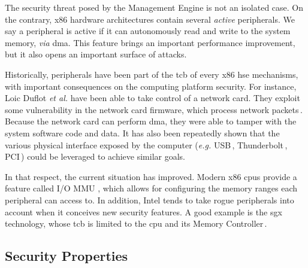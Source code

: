 The security threat posed by the Management Engine is not an isolated case.
%
On the contrary, x86 hardware architectures contain several \emph{active}
peripherals.
%
We say a peripheral is active if it can autonomously read and write to the
system memory, \emph{via} \ac{dma}.
%
This feature brings an important performance improvement, but it also opens an
important surface of attacks.

Historically, peripherals have been part of the \ac{tcb} of every x86 \ac{hse}
mechanisms, with important consequences on the computing platform security.
%
%
For instance, Loic Duflot \emph{et al.} have been able to take control of a
network card. They exploit some vulnerability in the network card firmware,
which process network packets\,\cite{duflot2010network}.
%
Because the network card can perform \ac{dma}, they were able to tamper with the
system software code and data.
%
It has also been repeatedly shown that the various physical interface exposed by
the computer (\emph{e.g.} USB\,\cite{nohl2014badusb},
Thunderbolt\,\cite{hudson2015thunderstrike}, PCI\,\cite{chifflier2013uefi})
could be leveraged to achieve similar goals.

In that respect, the current situation has improved.
%
Modern x86 \acp{cpu} provide a feature called I/O MMU , which allows
for configuring the memory ranges each peripheral can access to.
%
In addition, Intel tends to take rogue peripherals into account when it
conceives new security features.
%
%
A good example is the \ac{sgx} technology, whose \ac{tcb} is limited to the
\ac{cpu} and its Memory Controller\,\cite{costan2016sgxexplained}.

\subsection{Security Properties}

